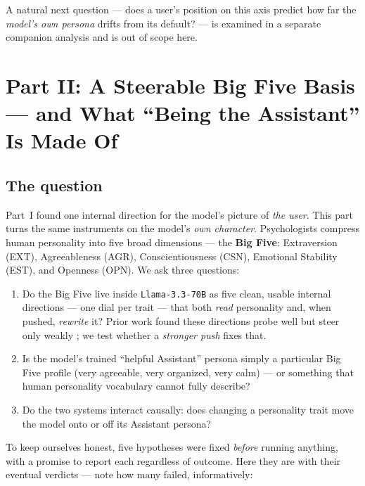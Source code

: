\documentclass[11pt]{article}
\begin{document}
A natural next question --- does a user's position on this axis predict how far
the \emph{model's own persona} drifts from its default? --- is examined in a
separate companion analysis and is out of scope here. 

\clearpage
\section{Part II: A Steerable Big Five Basis --- and What ``Being the
Assistant'' Is Made Of}

\subsection{The question}


Part~I found one internal direction for the model's picture of \emph{the user}.
This part turns the same instruments on the model's \emph{own character}.
Psychologists compress human personality into five broad dimensions --- the
\textbf{Big Five}: Extraversion (EXT), Agreeableness (AGR), Conscientiousness
(CSN), Emotional Stability (EST), and Openness (OPN). We ask three questions:

\begin{enumerate}
  \item Do the Big Five live inside \texttt{Llama-3.3-70B} as five clean,
        usable internal directions --- one dial per trait --- that both
        \emph{read} personality and, when pushed, \emph{rewrite} it? Prior work
        found these directions probe well but steer only weakly
        \citep{bigfivesteer}; we test whether
        a \emph{stronger push} fixes that.
  \item Is the model's trained ``helpful Assistant'' persona simply a particular
        Big Five profile (very agreeable, very organized, very calm) --- or
        something that human personality vocabulary cannot fully describe?
  \item Do the two systems interact causally: does changing a personality trait
        move the model onto or off its Assistant persona?
\end{enumerate}

To keep ourselves honest, five hypotheses were fixed \emph{before} running
anything, with a promise to report each regardless of outcome. Here they are
with their eventual verdicts --- note how many failed, informatively:
\end{document}
